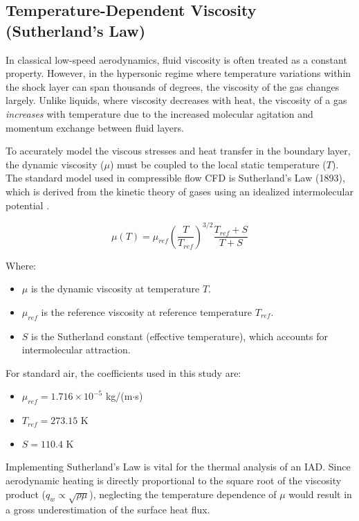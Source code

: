 \subsection{Temperature-Dependent Viscosity (Sutherland’s Law)}

In classical low-speed aerodynamics, fluid viscosity is often treated as a constant property. However, in the hypersonic regime where temperature variations within the shock layer can span thousands of degrees, the viscosity of the gas changes largely. Unlike liquids, where viscosity decreases with heat, the viscosity of a gas \textit{increases} with temperature due to the increased molecular agitation and momentum exchange between fluid layers.
\par
To accurately model the viscous stresses and heat transfer in the boundary layer, the dynamic viscosity ($\mu$) must be coupled to the local static temperature ($T$). The standard model used in compressible flow CFD is Sutherland’s Law (1893), which is derived from the kinetic theory of gases using an idealized intermolecular potential \cite{AndersonHypersonic}.

\begin{equation}
    \mu(T) = \mu_{ref} \left( \frac{T}{T_{ref}} \right)^{3/2} \frac{T_{ref} + S}{T + S}
\end{equation}

Where:
\begin{itemize}
    \item $\mu$ is the dynamic viscosity at temperature $T$.
    \item $\mu_{ref}$ is the reference viscosity at reference temperature $T_{ref}$.
    \item $S$ is the Sutherland constant (effective temperature), which accounts for intermolecular attraction.
\end{itemize}

For standard air, the coefficients used in this study are:
\begin{itemize}
    \item $\mu_{ref} = 1.716 \times 10^{-5}$ kg/(m$\cdot$s)
    \item $T_{ref} = 273.15$ K
    \item $S = 110.4$ K
\end{itemize}

Implementing Sutherland's Law is vital for the thermal analysis of an IAD. Since aerodynamic heating is directly proportional to the square root of the viscosity product ($q_w \propto \sqrt{\rho \mu}$), neglecting the temperature dependence of $\mu$ would result in a gross underestimation of the surface heat flux.

